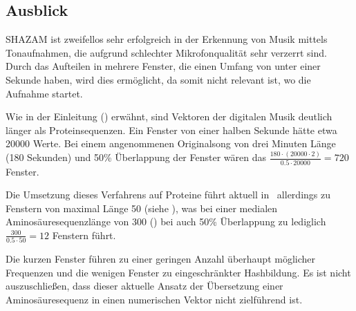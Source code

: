     \subsection*{Ausblick} %
        \label{sub:ausblick}
        SHAZAM ist zweifellos sehr erfolgreich in der Erkennung von Musik mittels Tonaufnahmen, die aufgrund schlechter Mikrofonqualität sehr verzerrt sind. Durch das Aufteilen in mehrere Fenster, die einen Umfang von unter einer Sekunde haben, wird dies ermöglicht, da somit nicht relevant ist, wo die Aufnahme startet.

        Wie in der Einleitung () erwähnt, sind Vektoren der digitalen Musik deutlich länger als Proteinsequenzen. Ein Fenster von einer halben Sekunde hätte etwa 20000 Werte. Bei einem angenommenen Originalsong von drei Minuten Länge (180 Sekunden) und 50\% Überlappung der Fenster wären das $\frac{180 \cdot (20000 \cdot 2)}{0.5 \cdot 20000}=720$ Fenster.

        Die Umsetzung dieses Verfahrens auf Proteine führt aktuell in \protfin\ allerdings zu Fenstern von maximal Länge 50 (siehe ), was bei einer medialen Aminosäuresequenzlänge von 300 () bei auch 50\% Überlappung zu lediglich $\frac{300}{0.5 \cdot 50}=12$ Fenstern führt.

        Die kurzen Fenster führen zu einer geringen Anzahl überhaupt möglicher Frequenzen und die wenigen Fenster zu eingeschränkter Hashbildung. Es ist nicht auszuschließen, dass dieser aktuelle Ansatz der Übersetzung einer Aminosäuresequenz in einen numerischen Vektor nicht zielführend ist.

